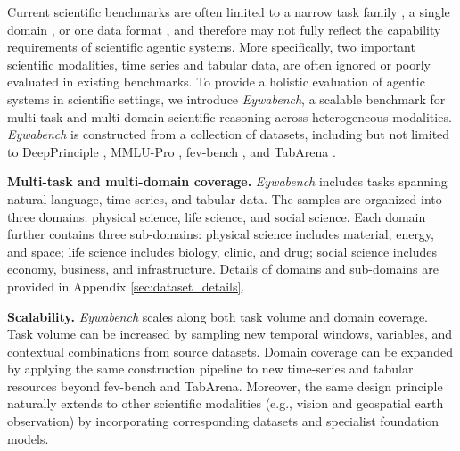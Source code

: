 \documentclass{llmxive}
\begin{document}
{Current scientific benchmarks are often limited to a narrow task family \cite{DBLP:journals/corr/WuRFGGPLP17, DBLP:journals/corr/abs-2502-14739}, a single domain \cite{DBLP:conf/emnlp/DaiYSZGHLZTGH25, DBLP:conf/emnlp/DaiYSZGHLZTGH25, DBLP:journals/corr/abs-2504-16074}, or one data format \cite{DBLP:journals/corr/abs-2505-19501, DBLP:journals/corr/abs-2507-03578, DBLP:conf/nips/JohnsonFGMBSF23, DBLP:conf/cvpr/0004WGWWCML0Z0025}, and therefore may not fully reflect the capability requirements of scientific agentic systems.
More specifically, two important scientific modalities, time series and tabular data, are often ignored or poorly evaluated in existing benchmarks.
To provide a holistic evaluation of agentic systems in scientific settings, we introduce \textit{Eywabench}, a scalable benchmark for multi-task and multi-domain scientific reasoning across heterogeneous modalities.
\textit{Eywabench} is constructed from a collection of datasets, including but not limited to DeepPrinciple \cite{song2025evaluating}, MMLU-Pro \cite{wang2024mmlu}, fev-bench \cite{DBLP:journals/corr/abs-2509-26468}, and TabArena \cite{DBLP:journals/corr/abs-2506-16791}.

\textbf{Multi-task and multi-domain coverage.} \textit{Eywabench} includes tasks spanning natural language, time series, and tabular data. The samples are organized into three domains: physical science, life science, and social science.
Each domain further contains three sub-domains: physical science includes material, energy, and space; life science includes biology, clinic, and drug; social science includes economy, business, and infrastructure.
Details of domains and sub-domains are provided in Appendix \ref{sec:dataset_details}.

\textbf{Scalability.} \textit{Eywabench} scales along both task volume and domain coverage.
Task volume can be increased by sampling new temporal windows, variables, and contextual combinations from source datasets.
Domain coverage can be expanded by applying the same construction pipeline to new time-series and tabular resources beyond fev-bench and TabArena. Moreover, the same design principle naturally extends to other scientific modalities (e.g., vision and geospatial earth observation) by incorporating corresponding datasets and specialist foundation models.

}
\end{document}
